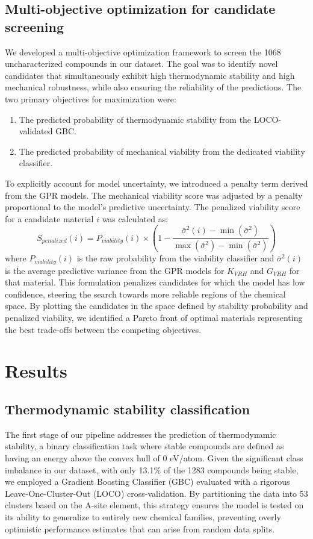 \documentclass[]{article}
\begin{document}
\subsection{Multi-objective optimization for candidate screening}
We developed a multi-objective optimization framework to screen the 1068 uncharacterized compounds in our dataset. The goal was to identify novel candidates that simultaneously exhibit high thermodynamic stability and high mechanical robustness, while also ensuring the reliability of the predictions. The two primary objectives for maximization were:
\begin{enumerate}
    \item The predicted probability of thermodynamic stability from the LOCO-validated GBC.
    \item The predicted probability of mechanical viability from the dedicated viability classifier.
\end{enumerate}
To explicitly account for model uncertainty, we introduced a penalty term derived from the GPR models. The mechanical viability score was adjusted by a penalty proportional to the model's predictive uncertainty. The penalized viability score for a candidate material $i$ was calculated as:
\begin{equation}
    S_{penalized}(i) = P_{viability}(i) \times \left(1 - \frac{\bar{\sigma}^2(i) - \min(\bar{\sigma}^2)}{\max(\bar{\sigma}^2) - \min(\bar{\sigma}^2)}\right)
\end{equation}
where $P_{viability}(i)$ is the raw probability from the viability classifier and $\bar{\sigma}^2(i)$ is the average predictive variance from the GPR models for $K_{VRH}$ and $G_{VRH}$ for that material. This formulation penalizes candidates for which the model has low confidence, steering the search towards more reliable regions of the chemical space. By plotting the candidates in the space defined by stability probability and penalized viability, we identified a Pareto front of optimal materials representing the best trade-offs between the competing objectives.

\section{Results}
\label{sec:results}
\subsection{Thermodynamic stability classification}

The first stage of our pipeline addresses the prediction of thermodynamic stability, a binary classification task where stable compounds are defined as having an energy above the convex hull of 0 eV/atom. Given the significant class imbalance in our dataset, with only 13.1\% of the 1283 compounds being stable, we employed a Gradient Boosting Classifier (GBC) evaluated with a rigorous Leave-One-Cluster-Out (LOCO) cross-validation. By partitioning the data into 53 clusters based on the A-site element, this strategy ensures the model is tested on its ability to generalize to entirely new chemical families, preventing overly optimistic performance estimates that can arise from random data splits.
\end{document}
